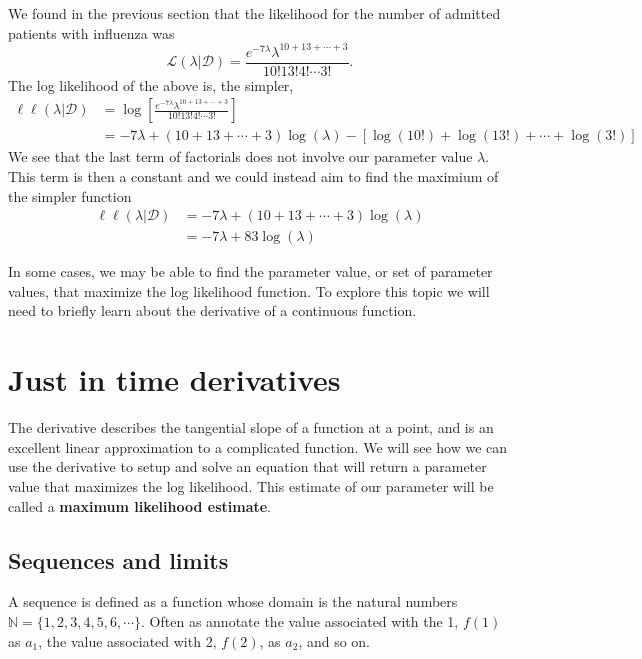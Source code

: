 \ex We found in the previous section that the likelihood for the number of admitted patients with influenza was
\begin{equation}
\mathcal{L}(\lambda | \mathcal{D}) = \frac{e^{-7\lambda} \lambda^{10+13+\cdots+3}}{10! 13! 4! \cdots 3!}.
\end{equation}
The log likelihood of the above is, the simpler, 
\begin{align}
    \ell \ell (\lambda | \mathcal{D}) &= \log \left[ \frac{e^{-7\lambda} \lambda^{10+13+\cdots+3}}{10! 13! 4! \cdots 3!} \right] \\ 
    &= -7 \lambda + (10+13+\cdots+3) \log(\lambda) - \left[ \log(10!) + \log(13!) + \cdots + \log(3!) \right]
\end{align}
We see that the last term of factorials does not involve our parameter value $\lambda$. 
This term is then a constant and we could instead aim to find the maximium of the simpler function 
\begin{align}
    \ell \ell (\lambda | \mathcal{D}) &= -7 \lambda + (10+13+\cdots+3) \log(\lambda) \\ 
    &=  -7 \lambda + 83\log(\lambda)
\end{align}

In some cases, we may be able to find the parameter value, or set of parameter values, that maximize the log likelihood function. 
To explore this topic we will need to briefly learn about the derivative of a continuous function. 

\section{ Just in time derivatives }

The derivative describes the tangential slope of a function at a point, and is an excellent linear approximation to a complicated function.
We will see how we can use the derivative to setup and solve an equation that will return a parameter value that maximizes the log likelihood. 
This estimate of our parameter will be called a \textbf{maximum likelihood estimate}.

\subsection{Sequences and limits}

A sequence is defined as a function whose domain is the natural numbers $\mathbb{N} = \{1,2,3,4,5,6, \cdots  \}$. 
Often as annotate the value associated with the 1, $f(1)$ as $a_{1}$, the value associated with 2, $f(2)$, as $a_{2}$, and so on.

